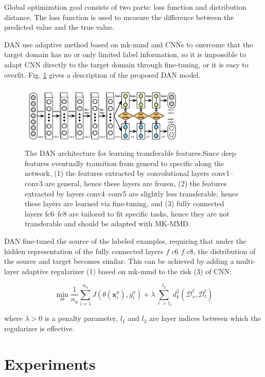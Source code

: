 \documentclass[conference]{IEEEtran}
\begin{document}
Global optimization goal consists of two parts: loss function and distribution distance. The loss function is used to measure the difference between the predicted value and the true value.

DAN use adaptive method based on mk-mmd and CNNs to onercome that the target domain has no or only limited label information, so it is impossible to adapt CNN directly to the target domain through fine-tuning, or it is easy to overfit. Fig. \ref{kFig2} gives a description of the proposed DAN model.

\begin{center}
	\begin{figure}[htbp]
		\centering
		\label{kFig2}
		\includegraphics[width=8cm]{image/DAN.png}
		\caption{The DAN architecture for learning transferable features.Since deep features eventually transition from general to specific along the network, (1) the features extracted by convolutional layers conv1–conv3 are general, hence these layers are frozen, (2) the features extracted by layers conv4–conv5 are slightly less transferable, hence these layers are learned via fine-tuning, and (3) fully connected layers fc6–fc8 are tailored to fit specific tasks, hence they are not transferable and should be adapted with MK-MMD.\cite{Long2015Learning}}
	\end{figure}
\end{center}

DAN fine-tuned the source of the labeled examples, requiring that under the hidden representation of the fully connected layers $f$ $c6$ $f$ $c8$, the distribution of the source and target becomes similar. This can be achieved by adding a multi-layer adaptive regularizer (1) based on mk-mmd to the risk (3) of CNN:

$$
\min _{\Theta} \frac{1}{n_{a}} \sum_{i=1}^{n_{a}} J\left(\theta\left(\mathbf{x}_{i}^{a}\right), y_{i}^{a}\right)+\lambda \sum_{\ell=l_{1}}^{l_{2}} d_{k}^{2}\left(\mathcal{D}_{s}^{\ell}, \mathcal{D}_{t}^{\ell}\right)
$$


where $\lambda > 0$ is a penalty parameter, $l_1$ and $l_2$ are layer indices between which the regularizer is effective.

\section{Experiments}
\end{document}

